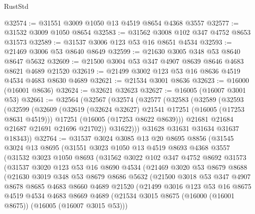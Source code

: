 \begin{lexlean}{RustStd}
\begin{coremodule}
@32574 := @31551 @3009 @1050 @13 @4519 @8654 @4368 @3557
@32577 := @31532 @3009 @1050 @8654
@32583 := @31562 @3008 @102 @347 @4752 @8653 @31573
@32589 := @31537 @3006 @123 @53 @16 @8651 @4534
@32593 := @21469 @3006 @53 @8640 @8649
@32599 := @21630 @3005 @348 @53 @8640 @8647 @5632
@32609 := @21500 @3004 @53 @347 @4907 @8639 @8646 @4683 @8621 @4689 @21520
@32619 := @21499 @3002 @123 @53 @16 @8636 @4519 @4534 @4683 @8630 @4689
@32621 := @21534 @3001 @8636
@32623 := @16000 (@16001 @8636)
@32624 := @32621 @32623
@32627 := @16005 (@16007 @3001 @53)
@32661 := @32564
    (@32567
      (@32574
        (@32577
          (@32583
            (@32589
              (@32593
                (@32599
                  (@32609
                    (@32619 (@32624 @32627) @21541 @17251 (@16005 (@17253 @8631 @4519)))
                    @17251
                    (@16005 (@17253 @8622 @8639)))
                  @21681
                  @21684
                  @21687
                  @21691
                  @21696
                  @21702))
              @31622)))
        @31628
        @31631
        @31634
        @31637
        @18343))
@32764 := @31537
    @3024
    @3085
    @13
    @20
    @8695
    @8856
    (@31545
      @3024
      @13
      @8695
      (@31551
        @3023
        @1050
        @13
        @4519
        @8693
        @4368
        @3557
        (@31532
          @3023
          @1050
          @8693
          (@31562
            @3022
            @102
            @347
            @4752
            @8692
            @31573
            (@31537
              @3020
              @123
              @53
              @16
              @8690
              @4534
              (@21469
                @3020
                @53
                @8679
                @8688
                (@21630
                  @3019
                  @348
                  @53
                  @8679
                  @8686
                  @5632
                  (@21500
                    @3018
                    @53
                    @347
                    @4907
                    @8678
                    @8685
                    @4683
                    @8660
                    @4689
                    @21520
                    (@21499
                      @3016
                      @123
                      @53
                      @16
                      @8675
                      @4519
                      @4534
                      @4683
                      @8669
                      @4689
                      (@21534 @3015 @8675 (@16000 (@16001 @8675)) (@16005 (@16007 @3015 @53)))

\end{coremodule}
\end{lexlean}
